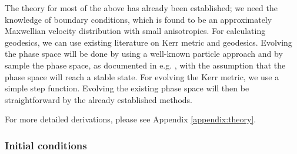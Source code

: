 \documentclass[12pt]{article}
\begin{document}
The theory for most of the above has already been established; 
we need the knowledge of boundary conditions, which is found to be 
an approximately Maxwellian velocity distribution \citep{dm_halo_maxwellian} with small anisotropies. 
For calculating geodesics, we can use 
existing literature on Kerr metric and geodesics. Evolving the 
phase space will be done by using a well-known particle approach and by sample the phase space, 
as documented in e.g. 
\citep{kuhlen2012numerical,schnittman2015}, with the assumption that the phase space will 
reach a stable state. For evolving the Kerr metric, we use a simple step function. Evolving 
the existing phase space will then be straightforward by the already established methods.


% 
% 
% 



% 
% 
% 
% 
% 
% 
% 

For more detailed derivations, please see Appendix \ref{appendix:theory}.

\subsubsection{Initial conditions}
\end{document}
